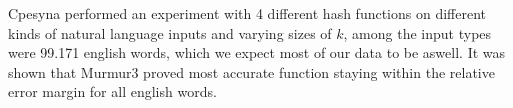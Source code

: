 Cpesyna \cite{KMV1} performed an experiment with 4 different hash functions on different kinds of natural language inputs and varying sizes of $k$, among the input types were 99.171 english words, which we expect most of our data to be aswell. It was shown that Murmur3 proved most accurate function staying within the relative error margin for all english words.
